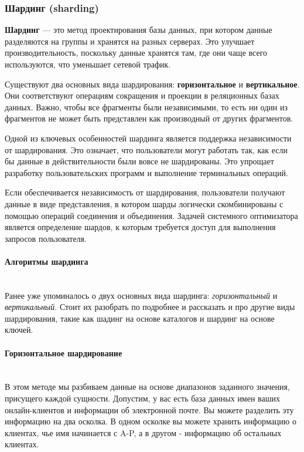 \subsubsection{Шардинг (sharding)}

\textbf{Шардинг} — это метод проектирования базы данных, при котором данные разделяются на группы и хранятся на разных серверах. Это улучшает производительность, поскольку данные хранятся там, где они чаще всего используются, что уменьшает сетевой трафик.

Существуют два основных вида шардирования: \textbf{горизонтальное} и \textbf{вертикальное}. Они соответствуют операциям сокращения и проекции в реляционных базах данных. Важно, чтобы все фрагменты были независимыми, то есть ни один из фрагментов не может быть представлен как производный от других фрагментов.

Одной из ключевых особенностей шардинга является поддержка независимости от шардирования. Это означает, что пользователи могут работать так, как если бы данные в действительности были вовсе не шардированы. Это упрощает разработку пользовательских программ и выполнение терминальных операций.

Если обеспечивается независимость от шардирования, пользователи получают данные в виде представления, в котором шарды логически скомбинированы с помощью операций соединения и объединения. Задачей системного оптимизатора является определение шардов, к которым требуется доступ для выполнения запросов пользователя.
\autocite{IntroBD2014}

\paragraph{Алгоритмы шардинга} ~\\
Ранее уже упоминалось о двух основных вида шардинга: \textit{горизонтальный} и \textit{вертикальный}. Стоит их разобрать по подробнее и
рассказать и про другие виды шардирования, такие как шадинг на основе каталогов и шардинг на основе ключей.

\paragraph{Горизонтальное шардирование} ~\\
В этом методе мы разбиваем данные на основе диапазонов заданного значения, присущего каждой сущности. Допустим, у вас
есть база данных имен ваших онлайн-клиентов и информации об электронной почте. Вы можете разделить эту информацию на
два осколка. В одном осколке вы можете хранить информацию о клиентах, чье имя начинается с A-P, а в другом - информацию
об остальных клиентах.

